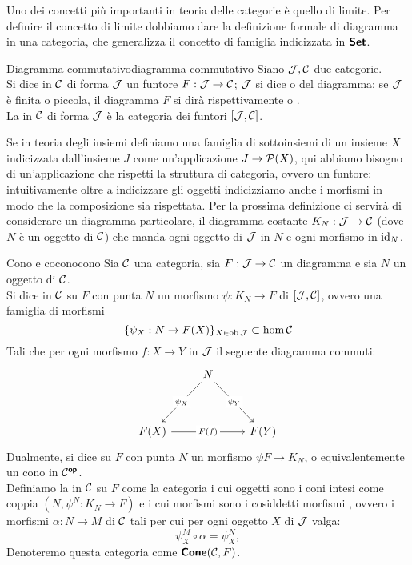 \documentclass{article}
\renewcommand\C{\mc{C}}
\newcommand\J{\mc{J}}
\begin{document}
Uno dei concetti più importanti in teoria delle categorie è quello di limite. Per definire il concetto di limite dobbiamo dare la definizione formale di diagramma in una categoria, che generalizza il concetto di famiglia indicizzata in $\text{\sffamily\textbf{Set}}$.

\begin{definition}{Diagramma commutativo}{diagramma commutativo}
    Siano $\J, \C$ due categorie.\\
    Si dice  in $\C$ di forma $\J$ un funtore $F:\J\to\C$; $\J$ si dice  o  del diagramma: se $\J$ è finita o piccola, il diagramma $F$ si dirà rispettivamente  o .\\
    La  in $\C$ di forma $\J$ è la categoria dei funtori $[\J,\C]$.
\end{definition}

Se in teoria degli insiemi definiamo una famiglia di sottoinsiemi di un insieme $X$ indicizzata dall'insieme $J$ come un'applicazione $J\to \mathcal{P}(X)$, qui abbiamo bisogno di un'applicazione che rispetti la struttura di categoria, ovvero un funtore: intuitivamente oltre a indicizzare gli oggetti indicizziamo anche i morfismi in modo che la composizione sia rispettata. Per la prossima definizione ci servirà di considerare un diagramma particolare, il diagramma costante $K_N : \J\to \C$ (dove $N$ è un oggetto di $\C$) che manda ogni oggetto di $\J$ in $N$ e ogni morfismo in $\operatorname{id}_N$.

\begin{definition}{Cono e cocono}{cono}
    Sia $\C$ una categoria, sia $F: \J\to\C$ un diagramma e sia $N$ un oggetto di $\C$.\\
    Si dice  in $\C$ su $F$ con punta $N$ un morfismo $\psi : K_N \to F$ di $[\J,\C]$, ovvero una famiglia di morfismi \[\{\psi_X : N\to F(X)\}_{X \in \ob\J} \subset \hom\C\]
    Tali che per ogni morfismo $f:X\to Y$ in $\J$ il seguente diagramma commuti:
    \[\begin{tikzcd}
    	& N \\
    	\\
    	{F(X)} && {F(Y)}
    	\arrow["{\psi_X}"{description}, from=1-2, to=3-1]
    	\arrow["{\psi_Y}"{description}, from=1-2, to=3-3]
	    \arrow["{F(f)}"{description}, from=3-1, to=3-3]
    \end{tikzcd}\]
    Dualmente, si dice  su $F$ con punta $N$ un morfismo $\psi F \to K_N$, o equivalentemente un cono in $\C^\op$.\\
    Definiamo la  in $\C$ su $F$ come la categoria i cui oggetti sono i coni intesi come coppia $(N, \psi^N: K_N \to F )$ e i cui morfismi sono i cosiddetti morfismi , ovvero i morfismi $\alpha : N\to M$ di $\C$ tali per cui per ogni oggetto $X$ di $\J$ valga:
    \[\psi^M_X\circ \alpha = \psi^N_X,\]
    Denoteremo questa categoria come $\cone(\C,F)$.
\end{definition}
\end{document}
